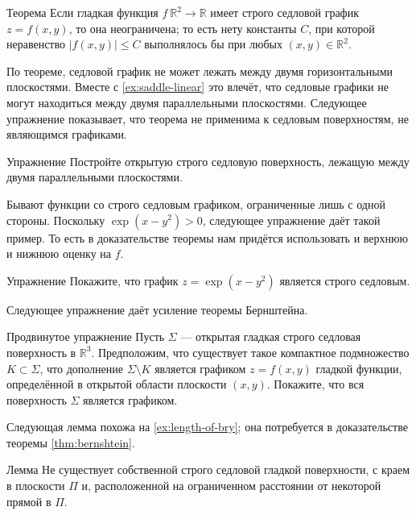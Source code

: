 \begin{thm}{Теорема}\label{thm:bernshtein}
Если гладкая функция $f\:\mathbb{R}^2\to\mathbb{R}$ имеет строго седловой график $z=f(x,y)$, то она неограничена;
то есть нету константы $C$, при которой неравенство 
$|f(x,y)|\le C$ выполнялось бы при любых $(x,y)\in\mathbb{R}^2$.
\end{thm}

По теореме, седловой график не может лежать между двумя горизонтальными плоскостями.
Вместе с \ref{ex:saddle-linear} это влечёт, что седловые графики не могут находиться между двумя параллельными плоскостями.
Следующее упражнение показывает, что теорема не применима к седловым поверхностям, не являющимся графиками.

\begin{thm}{Упражнение}\label{ex:between-parallels}
Постройте открытую строго седловую поверхность, лежащую между двумя параллельными плоскостями.
\end{thm}


Бывают функции со строго седловым графиком, ограниченные лишь с одной стороны.
Поскольку $\exp(x-y^2)>0$, следующее упражнение даёт такой пример.
То есть в доказательстве теоремы нам придётся использовать и верхнюю и нижнюю оценку на $f$.

\begin{thm}{Упражнение}\label{ex:one-side-bernshtein}
Покажите, что график
$z=\exp(x-y^2)$
является строго седловым.
\end{thm}

Следующее упражнение даёт усиление теоремы Бернштейна.

\begin{thm}{Продвинутое упражнение}\label{ex:saddle-graph}
Пусть $\Sigma$ --- открытая гладкая строго седловая поверхность в $\mathbb{R}^3$.
Предположим, что существует такое компактное подмножество $K\subset \Sigma$, что дополнение $\Sigma\setminus K$ является графиком $z=f(x,y)$ гладкой функции, определённой в открытой области плоскости $(x,y)$.
Покажите, что вся поверхность $\Sigma$ является графиком.
\end{thm}


Следующая лемма похожа на \ref{ex:length-of-bry};
она потребуется в доказательстве теоремы \ref{thm:bernshtein}.

\begin{thm}{Лемма}\label{lem:region}
Не существует собственной строго седловой гладкой поверхности, с краем в плоскости $\Pi$ и, расположенной на ограниченном расстоянии от некоторой прямой в $\Pi$.
\end{thm}

